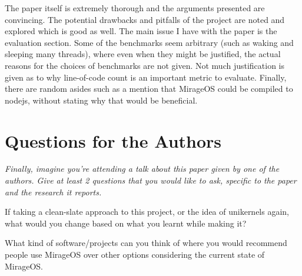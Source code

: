 \documentclass[11pt]{article}
\begin{document}
The paper itself is extremely thorough and the arguments presented are
convincing. The potential drawbacks and pitfalls of the project are noted and
explored which is good as well. The main issue I have with the paper is the
evaluation section. Some of the benchmarks seem arbitrary (such as waking and
sleeping many threads), where even when they might be justified, the actual
reasons for the choices of benchmarks are not given. Not much justification is
given as to why line-of-code count is an important metric to evaluate. Finally,
there are random asides such as a mention that MirageOS could be compiled to
nodejs, without stating why that would be beneficial.


\section*{Questions for the Authors}

\textsl{Finally, imagine you're attending a talk about this paper given by one
of the authors. Give at least 2 questions that you would like to ask, specific
to the paper and the research it reports.}

If taking a clean-slate approach to this project, or the idea of unikernels
again, what would you change based on what you learnt while making it?

What kind of software/projects can you think of where you would recommend
people use MirageOS over other options considering the current state of
MirageOS.





\end{document}

